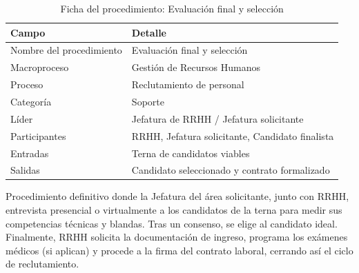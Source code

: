 \documentclass[11pt, a4paper, oneside]{report}
\begin{document}
\begin{table}[H]
\centering\small
\renewcommand{\arraystretch}{1.25}
\setlength{\tabcolsep}{6pt}
\begin{tabularx}{\textwidth}{|>{\raggedright\arraybackslash}p{}|>{\raggedright\arraybackslash}X|}
\hline
\rowcolor{upeu_mid}
\color{white}\bfseries Campo & \color{white}\bfseries Detalle \\ \hline
\rowcolor{gray!10}
Nombre del procedimiento & Evaluación final y selección \\ \hline
\rowcolor{gray!10}
Macroproceso & Gestión de Recursos Humanos \\ \hline
Proceso & Reclutamiento de personal \\ \hline
\rowcolor{gray!10}
Categoría & Soporte \\ \hline
Líder & Jefatura de RRHH / Jefatura solicitante \\ \hline
\rowcolor{gray!10}
Participantes & RRHH, Jefatura solicitante, Candidato finalista \\ \hline
Entradas & Terna de candidatos viables \\ \hline
\rowcolor{gray!10}
Salidas & Candidato seleccionado y contrato formalizado \\ \hline
\end{tabularx}
\caption{Ficha del procedimiento: Evaluación final y selección}
\end{table}

Procedimiento definitivo donde la Jefatura del área solicitante, junto con RRHH, entrevista presencial o virtualmente a los candidatos de la terna para medir sus competencias técnicas y blandas. Tras un consenso, se elige al candidato ideal. Finalmente, RRHH solicita la documentación de ingreso, programa los exámenes médicos (si aplican) y procede a la firma del contrato laboral, cerrando así el ciclo de reclutamiento.
\end{document}
